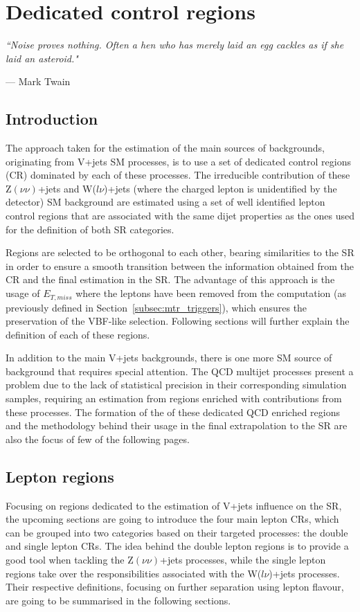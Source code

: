 \chapter{Dedicated control regions}
\label{ch:control_regions}
\epigraph{\itshape``Noise proves nothing. Often a hen who has merely laid an egg cackles as if she laid an asteroid."}{--- \textup{Mark Twain}}

\section{Introduction}
\hspace{10pt} The approach taken for the estimation of the main sources of backgrounds, originating from V+jets SM processes, is to use a set of dedicated control regions (CR) dominated by each of these processes. The irreducible contribution of these Z$(\nu\nu)$+jets and W($l\nu$)+jets (where the charged lepton is unidentified by the detector) SM background are estimated using a set of well identified lepton control regions that are associated with the same dijet properties as the ones used for the definition of both SR categories.

\hspace{10pt} Regions are selected to be orthogonal to each other, bearing similarities to the SR in order to ensure a smooth transition between the information obtained from the CR and the final estimation in the SR. The advantage of this approach is the usage of $E_{T, miss}$ where the leptons have been removed from the computation (as previously defined in Section~\ref{subsec:mtr_triggers}), which ensures the preservation of the VBF-like selection. Following sections will further explain the definition of each of these regions.

\hspace{10pt} In addition to the main V+jets backgrounds, there is one more SM source of background that requires special attention. The QCD multijet processes present a problem due to the lack of statistical precision in their corresponding simulation samples, requiring an estimation from regions enriched with contributions from these processes. The formation of the of these dedicated QCD enriched regions and the methodology behind their usage in the final extrapolation to the SR are also the focus of few of the following pages.

\section{Lepton regions}
\hspace{10pt} Focusing on regions dedicated to the estimation of V+jets influence on the SR, the upcoming sections are going to introduce the four main lepton CRs, which can be grouped into two categories based on their targeted processes: the double and single lepton CRs. The idea behind the double lepton regions is to provide a good tool when tackling the Z$(\nu\nu)$+jets processes, while the single lepton regions take over the responsibilities associated with the W($l\nu$)+jets processes. Their respective definitions, focusing on further separation using lepton flavour, are going to be summarised in the following sections.

